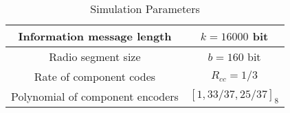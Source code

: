 \documentclass[journal, a4paper]{IEEEtran}
\begin{document}
    \begin{table}[!hbt]
        \begin{center}
            \caption{Simulation Parameters}
            \label{tab:simParameters}
            \begin{tabular}{|c|c|}
                \hline
                Information message length & $k=16000$ bit \\
                \hline
                Radio segment size & $b=160$ bit \\
                \hline
                Rate of component codes & $R_{cc}=1/3$\\
                \hline
                Polynomial of component encoders & $[1 , 33/37 , 25/37]_8$\\
                \hline
            \end{tabular}
        \end{center}
    \end{table}

\end{document}
